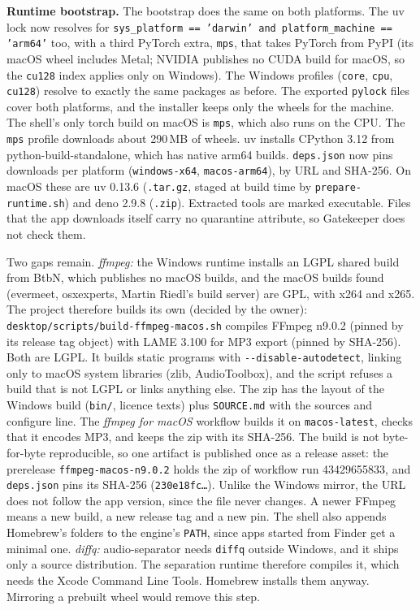\textbf{Runtime bootstrap.} The bootstrap does the same on both platforms.
The uv lock now resolves for
\texttt{sys\_platform == 'darwin' and platform\_machine == 'arm64'} too, with
a third PyTorch extra, \texttt{mps}, that takes PyTorch from PyPI (its macOS
wheel includes Metal; NVIDIA publishes no CUDA build for macOS, so the
\texttt{cu128} index applies only on Windows). The Windows profiles
(\texttt{core}, \texttt{cpu}, \texttt{cu128}) resolve to exactly the same
packages as before. The exported \texttt{pylock} files cover both platforms,
and the installer keeps only the wheels for the machine. The shell's only
torch build on macOS is \texttt{mps}, which also runs on the CPU. The
\texttt{mps} profile downloads about 290\,MB of wheels. uv installs CPython
3.12 from python-build-standalone, which has native arm64 builds.
\texttt{deps.json} now pins downloads per platform (\texttt{windows-x64},
\texttt{macos-arm64}), by URL and SHA-256. On macOS these are uv 0.13.6
(\texttt{.tar.gz}, staged at build time by \texttt{prepare-runtime.sh}) and
deno 2.9.8 (\texttt{.zip}). Extracted tools are marked executable. Files
that the app downloads itself carry no quarantine attribute, so Gatekeeper
does not check them.

Two gaps remain. \emph{ffmpeg:} the Windows runtime installs an LGPL shared
build from BtbN, which publishes no macOS builds, and the macOS builds found
(evermeet, osxexperts, Martin Riedl's build server) are GPL, with x264 and
x265. The project therefore builds its own (decided by the owner):
\texttt{desktop/scripts/build-ffmpeg-macos.sh} compiles FFmpeg n9.0.2 (pinned
by its release tag object) with LAME 3.100 for MP3 export (pinned by
SHA-256). Both are LGPL. It builds static programs with
\texttt{-{}-disable-autodetect}, linking only to macOS system libraries
(zlib, AudioToolbox), and the script refuses a build that is not LGPL or links
anything else. The zip has the layout of the Windows build (\texttt{bin/},
licence texts) plus \texttt{SOURCE.md} with the sources and configure line.
The \emph{ffmpeg for macOS} workflow builds it on \texttt{macos-latest},
checks that it encodes MP3, and keeps the zip with its SHA-256. The build is
not byte-for-byte reproducible, so one artifact is published once as a release
asset: the prerelease \texttt{ffmpeg-macos-n9.0.2} holds the zip of
workflow run 43429655833, and \texttt{deps.json} pins its SHA-256
(\texttt{230e18fc\ldots}). Unlike the Windows mirror, the URL does not follow
the app version, since the file never changes. A newer FFmpeg means a new
build, a new release tag and a new pin. The shell also appends Homebrew's
folders to the engine's \texttt{PATH}, since apps started from Finder get a
minimal one. \emph{diffq:} audio-separator
needs \texttt{diffq} outside Windows, and it ships only a source
distribution. The separation runtime therefore compiles it, which needs the
Xcode Command Line Tools. Homebrew installs them anyway. Mirroring a prebuilt
wheel would remove this step.

